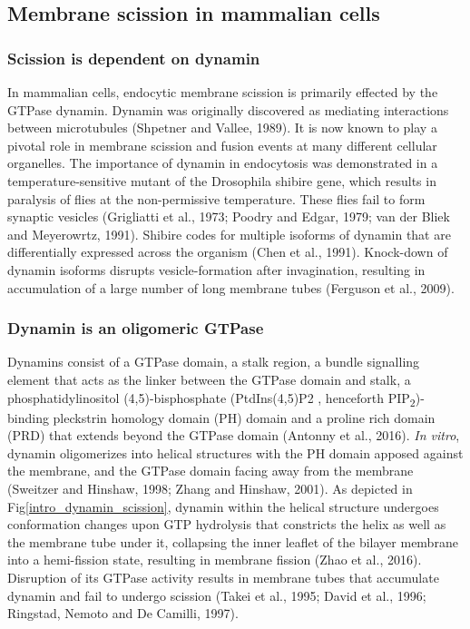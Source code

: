 		
		\newpage
\subsection{Membrane scission in mammalian cells}
		\subsubsection{Scission is dependent on dynamin} 
In mammalian cells, endocytic membrane scission is primarily effected by the GTPase dynamin. Dynamin was originally discovered as mediating interactions between microtubules (Shpetner and Vallee, 1989). It is now known to play a pivotal role in membrane scission and fusion events at many different cellular organelles. The importance of dynamin in endocytosis was demonstrated in a temperature-sensitive mutant of the Drosophila shibire gene, which results in paralysis of flies at the non-permissive temperature. These flies fail to form synaptic vesicles (Grigliatti et al., 1973; Poodry and Edgar, 1979; van der Bliek and Meyerowrtz, 1991). Shibire codes for multiple isoforms of dynamin that are differentially expressed across the organism (Chen et al., 1991). Knock-down of dynamin isoforms disrupts vesicle-formation after invagination, resulting in accumulation of a large number of long membrane tubes (Ferguson et al., 2009). 

		\subsubsection{Dynamin is an oligomeric GTPase}
Dynamins consist of a GTPase domain, a stalk region, a bundle signalling element that acts as the linker between the GTPase domain and stalk, a phosphatidylinositol (4,5)-bisphosphate (PtdIns(4,5)P2 , henceforth 	PIP\textsubscript{2})- binding pleckstrin homology domain (PH) domain and a proline rich domain (PRD) that extends beyond the GTPase domain (Antonny et al., 2016). \textit{In vitro}, dynamin oligomerizes into helical structures with the PH domain apposed against the membrane, and the GTPase domain facing away from the membrane (Sweitzer and Hinshaw, 1998; Zhang and Hinshaw, 2001). As depicted in Fig\ref{intro_dynamin_scission}, dynamin within the helical structure undergoes conformation changes upon GTP hydrolysis that constricts the helix as well as the membrane tube under it, collapsing the inner leaflet of the bilayer membrane into a hemi-fission state, resulting in membrane fission (Zhao et al., 2016). Disruption of its GTPase activity results in membrane tubes that accumulate dynamin and fail to undergo scission (Takei et al., 1995; David et al., 1996; Ringstad, Nemoto and De Camilli, 1997).

